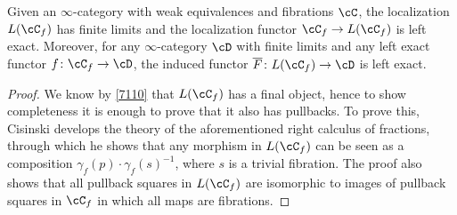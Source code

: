 \begin{prop}\label{756}

  Given an $\infty$-category with weak equivalences and fibrations $\cC$, the
  localization $L(\cC_f)$ has finite limits and the localization functor
  $\cC_f\rightarrow L(\cC_f)$ is left exact. Moreover, for any $\infty$-category
  $\cD$ with finite limits and any left exact functor
  $f\colon\cC_f\rightarrow\cD$, the induced functor $\overline{F}\colon
  L(\cC_f)\rightarrow\cD$ is left exact.
\end{prop}
\begin{proof}


  We know by \ref{7110} that $L(\cC_f)$ has a final object, hence to show
  completeness it is enough to prove that it also has pullbacks.
  To prove this, Cisinski develops the theory of the aforementioned right
  calculus of fractions, through which he shows that any morphism in
  $L(\cC_f)$ can be seen as a composition $\gamma_f(p)\cdot\gamma_f(s)^{-1}$,
  where $s$ is a trivial fibration. The proof also shows that all pullback
  squares in $L(\cC_f)$ are isomorphic to images of pullback squares in $\cC_f$
  in which all maps are fibrations.
\end{proof}

